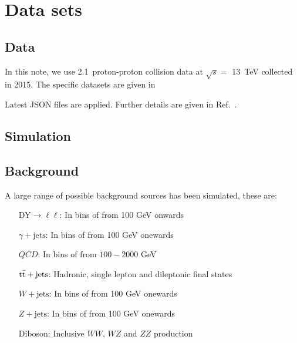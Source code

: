 \section{Data sets}
\label{sec:datasets}

\subsection{Data}


In this note, we use 2.1~\ifb proton-proton collision data at $\sqrt{s} =$ 13~TeV collected in 2015. The specific datasets are given in 

\begin{table}[!h]
\footnotesize 
\label{tab:datasets_data}
\end{table}

Latest JSON files are applied. Further details are given in Ref.~\cite{alphaTnote}. 



\subsection{Simulation}

\subsection{Background}

A large range of possible background sources has been simulated, these are:

\begin{center}
  \begin{itemize}
  \item[DY$\to \ell \ell$:] In bins of \HT from 100 GeV onwards
  \item[$\gamma+\textrm{jets}$:] In bins of \HT from 100 GeV onewards
  \item[$QCD$:] In bins of \HT from $100-2000$ GeV 
  \item[$\rm{t}\bar{\rm{t}} + jets$:] Hadronic, single lepton and dileptonic final states
  \item[$W+\textrm{jets}$:] In bins of \HT from 100 GeV onewards
  \item[$Z+\textrm{jets}$:] In bins of \HT from 100 GeV onewards
  \item[Diboson:] Inclusive $WW$, $WZ$ and $ZZ$ production
  \end{itemize}
\end{center}




